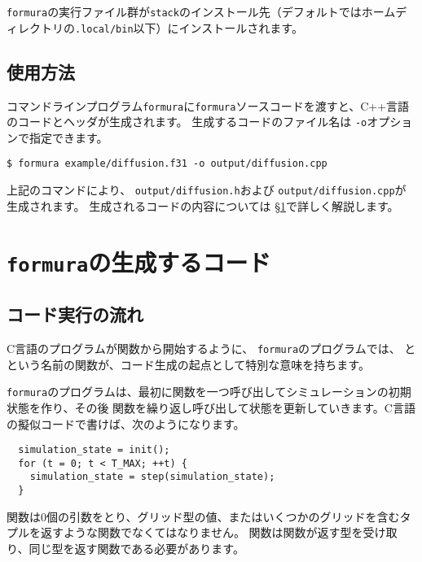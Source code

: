 \documentclass{jsarticle}
\newcommand{\formura}{{\texttt{formura}}}
\begin{document}
\formura の実行ファイル群が\verb`stack`のインストール先（デフォルトではホームディレクトリの\verb+.local/bin+以下）にインストールされます。


\subsection{使用方法}

コマンドラインプログラム\formura に\formura ソースコードを渡すと、C++言語のコードとヘッダが生成されます。
生成するコードのファイル名は
\verb`-o`オプションで指定できます。

\begin{verbatim}
$ formura example/diffusion.f31 -o output/diffusion.cpp
\end{verbatim}

上記のコマンドにより、
\verb`output/diffusion.h`および
\verb`output/diffusion.cpp`が生成されます。
生成されるコードの内容については
\S \ref{sec:formura-generated-code}で詳しく解説します。


\newpage

\section{\formura の生成するコード}\label{sec:formura-generated-code}

\subsection{コード実行の流れ}

C言語のプログラムが関数から開始するように、
\formura のプログラムでは、
と
という名前の関数が、コード生成の起点として特別な意味を持ちます。

\formura のプログラムは、最初に関数を一つ呼び出してシミュレーションの初期状態を作り、その後
関数を繰り返し呼び出して状態を更新していきます。C言語の擬似コードで書けば、次のようになります。

\begin{screen}
\begin{verbatim}
  simulation_state = init();
  for (t = 0; t < T_MAX; ++t) {
    simulation_state = step(simulation_state);
  }
\end{verbatim}
\end{screen}


関数は0個の引数をとり、グリッド型の値、またはいくつかのグリッドを含むタプルを返すような関数でなくてはなりません。
関数は関数が返す型を受け取り、同じ型を返す関数である必要があります。
\end{document}
